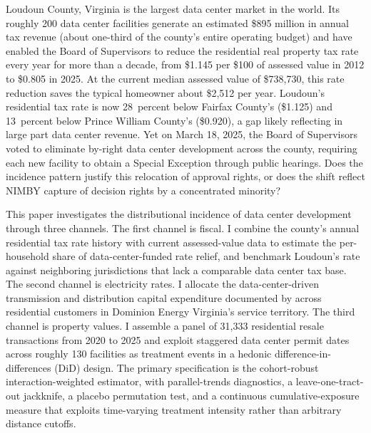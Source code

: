 \documentclass[12pt]{article}
\begin{document}
Loudoun County, Virginia is the largest data center market in the world. Its roughly 200 data center facilities generate an estimated \$895 million in annual tax revenue (about one-third of the county's entire operating budget) and have enabled the Board of Supervisors to reduce the residential real property tax rate every year for more than a decade, from \$1.145 per \$100 of assessed value in 2012 to \$0.805 in 2025. At the current median assessed value of \$738,730, this rate reduction saves the typical homeowner about \$2,512 per year. Loudoun's residential tax rate is now 28~percent below Fairfax County's (\$1.125) and 13~percent below Prince William County's (\$0.920), a gap likely reflecting in large part data center revenue. Yet on March 18, 2025, the Board of Supervisors voted to eliminate by-right data center development across the county, requiring each new facility to obtain a Special Exception through public hearings. Does the incidence pattern justify this relocation of approval rights, or does the shift reflect NIMBY capture of decision rights by a concentrated minority?

This paper investigates the distributional incidence of data center development through three channels. The first channel is fiscal. I combine the county's annual residential tax rate history with current assessed-value data to estimate the per-household share of data-center-funded rate relief, and benchmark Loudoun's rate against neighboring jurisdictions that lack a comparable data center tax base. The second channel is electricity rates. I allocate the data-center-driven transmission and distribution capital expenditure documented by \citet{JLARC2024} across residential customers in Dominion Energy Virginia's service territory. The third channel is property values. I assemble a panel of 31,333 residential resale transactions from 2020 to 2025 and exploit staggered data center permit dates across roughly 130 facilities as treatment events in a hedonic difference-in-differences (DiD) design. The primary specification is the \citet{SunAbraham2021} cohort-robust interaction-weighted estimator, with parallel-trends diagnostics, a leave-one-tract-out jackknife, a placebo permutation test, and a continuous cumulative-exposure measure that exploits time-varying treatment intensity rather than arbitrary distance cutoffs.
\end{document}
